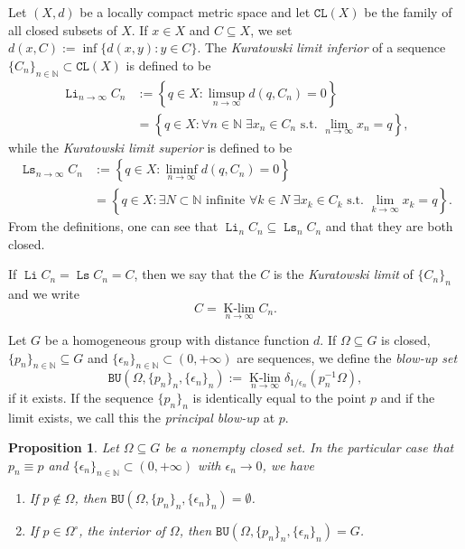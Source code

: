 \documentclass{article}
\newtheorem{prop}[theorem]{Proposition}
\theoremstyle{definition}
\newcommand{\BU}{\mathtt{BU}}
\DeclareMathOperator*{\Li}{\mathtt{Li}}
\DeclareMathOperator*{\Ls}{\mathtt{Ls}}
\newcommand{\Klim}{\operatorname*{K-lim}}
\newcommand{\inv}{^{-1}}
\newcommand{\N}{{\mathbb N}}
\begin{document}
\newcommand{\CL}{\mathtt{CL}}
Let $(X,d)$ be a locally compact metric space and let $\CL(X)$ be the family of all closed subsets of $X$.
If $x\in X$ and $C\subseteq X$, we set $d(x,C):=\inf\{d(x,y):y\in C\}$.
The {\em Kuratowski limit inferior} of a sequence $\{C_n\}_{n\in\N}\subset\CL(X)$ is defined to be
\begin{align*}
\Li_{n\to \infty} C_n 
&:= \left\{ q \in X : \limsup_{n\to \infty} d(q, C_n) = 0 \right\} \\
&= \left\{q\in X: \forall n\in\N\;\exists x_n\in C_n\text{ s.t.~}\lim_{n\to\infty}x_n=q \right\},
\end{align*}
while the {\em Kuratowski limit superior} is defined to be
\begin{align*}
\Ls_{n\to \infty} C_n 
&:= \left\{ q \in X : \liminf_{n\to \infty} d(q, C_n) = 0\right\} \\
&= \left\{q\in X: \exists N\subset\N\text{ infinite }\forall k\in N\;\exists x_{k}\in C_{k}\text{ s.t.~}\lim_{k\to\infty} x_{k}=q \right\}.
\end{align*}
From the definitions, one can see that $\Li_n C_n \subseteq \Ls_n C_n$ and that they are both closed.

If $\Li C_n = \Ls C_n = C$, then we say that the $C$ is the {\em Kuratowski limit} of $\{C_n\}_n$ and we write
\[
C=\Klim_{n\to\infty} C_n .
\]


Let $G$ be a homogeneous group with distance function $d$.
If $\Omega\subseteq G$ is closed, $\{p_n\}_{n\in\N}\subseteq G$ and $\{\epsilon_n\}_{n\in\N}\subset(0,+\infty)$ are sequences, we define the \emph{blow-up set}
\[
\BU(\Omega,\{p_n\}_n,\{\epsilon_n\}_n) 
:= \Klim_{n\to \infty} \delta_{1/\epsilon_n}(p_n\inv \Omega) ,
\]
if it exists. If the sequence $\{p_n\}_n$ is identically equal to the point $p$ and if the limit exists, we call this the {\em principal blow-up} at $p$.

\begin{prop}\label{prop03241537}{\cite[Proposition 3.5]{FNG}}
	Let $\Omega\subseteq G$ be a nonempty closed set. In the particular case that $p_n\equiv p$ and $\{\epsilon_n\}_{n\in\N}\subset(0,+\infty)$ with $\epsilon_n\to 0$, we have
	\begin{enumerate}
	\item
	If $p\notin\Omega$, then $\BU(\Omega,\{p_n\}_n,\{\epsilon_n\}_n)=\emptyset$.
	\item
	If $p\in \Omega^\circ$, the interior of $\Omega$, then $\BU(\Omega,\{p_n\}_n,\{\epsilon_n\}_n)= G$.
	\end{enumerate}
\end{prop}
\end{document}

